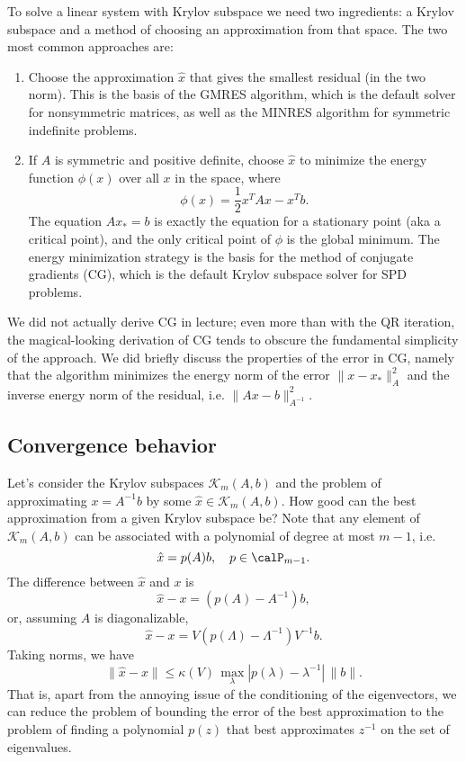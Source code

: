 \documentclass[12pt, leqno]{article}
\newcommand{\calK}{\mathcal{K}}
\begin{document}
To solve a linear system with Krylov subspace we need two ingredients:
a Krylov subspace and a method of choosing an approximation from that
space.  The two most common approaches are:
\begin{enumerate}
\item
  Choose the approximation $\hat{x}$ that gives the smallest residual
  (in the two norm).  This is the basis of the GMRES algorithm, which
  is the default solver for nonsymmetric matrices, as well as the
  MINRES algorithm for symmetric indefinite problems.
\item
  If $A$ is symmetric and positive definite, choose $\hat{x}$ to minimize
  the energy function $\phi(x)$ over all $x$ in the space, where
  \[
    \phi(x) = \frac{1}{2} x^T A x - x^T b.
  \]
  The equation $Ax_* = b$ is exactly the equation for a stationary
  point (aka a critical point), and the only critical point of $\phi$
  is the global minimum.  The energy minimization strategy is the
  basis for the method of conjugate gradients (CG), which is the
  default Krylov subspace solver for SPD problems.
\end{enumerate}
We did not actually derive CG in lecture; even more than with the QR
iteration, the magical-looking derivation of CG tends to obscure the
fundamental simplicity of the approach.  We did briefly discuss the
properties of the error in CG, namely that the algorithm minimizes the
energy norm of the error $\|x-x_*\|_A^2$ and the inverse energy norm
of the residual, i.e. $\|Ax-b\|_{A^{-1}}^2$.

\subsection{Convergence behavior}

Let's consider the Krylov subspaces $\calK_{m}(A,b)$ and the problem
of approximating $x = A^{-1} b$ by some $\hat{x} \in \calK_m(A,b)$.
How good can the best approximation from a given Krylov subspace be?
Note that any element of $\calK_m(A,b)$ can be associated with a
polynomial of degree at most $m-1$, i.e.
\[
  \hat{x} = p(A) b, \quad p \in \calP_{m-1}.
\]
The difference between $\hat{x}$ and $x$ is
\[
  \hat{x}-x = (p(A)-A^{-1})b,
\]
or, assuming $A$ is diagonalizable,
\[
  \hat{x}-x = V (p(\Lambda)-\Lambda^{-1}) V^{-1} b.
\]
Taking norms, we have
\[
  \|\hat{x}-x\| \leq \kappa(V) \, \max_{\lambda}
  |p(\lambda)-\lambda^{-1}| \, \|b\|.
\]
That is, apart from the annoying issue of the conditioning of the
eigenvectors, we can reduce the problem of bounding the error of
the best approximation to the problem of finding a polynomial
$p(z)$ that best approximates $z^{-1}$ on the set of eigenvalues.
\end{document}
